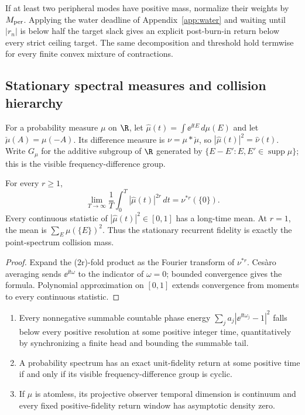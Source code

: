 If at least two peripheral modes have positive mass, normalize their weights
by $M_{\rm per}$.  Applying the water deadline of Appendix~\ref{app:water} and waiting
until $|r_n|$ is below half the target slack gives an explicit post-burn-in
return below every strict ceiling target.  The same decomposition and
threshold hold termwise for every finite convex mixture of contractions.

\subsection{Stationary spectral measures and collision hierarchy}

For a probability measure $\mu$ on $\R$, let
$\widehat\mu(t)=\int\ee^{\ii tE}\,d\mu(E)$ and let
$\check\mu(A)=\mu(-A)$.  Its difference measure is
$\nu=\mu*\check\mu$, so
$|\widehat\mu(t)|^2=\widehat\nu(t)$.
Write $G_\mu$ for the additive subgroup of $\R$ generated by
$\{E-E':E,E'\in\operatorname{supp}\mu\}$; this is the visible
frequency-difference group.

\begin{theorem}
For every $r\ge1$,
\[
 \lim_{T\to\infty}\frac1T\int_0^T
   |\widehat\mu(t)|^{2r}\,dt
 =\nu^{*r}(\{0\}).
\]
Every continuous statistic of $|\widehat\mu(t)|^2\in[0,1]$ has a
long-time mean.  At $r=1$, the mean is
$\sum_E\mu(\{E\})^2$.  Thus the stationary recurrent fidelity is exactly
the point-spectrum collision mass.
\end{theorem}

\begin{proof}
Expand the (2r)-fold product as the Fourier transform of $\nu^{*r}$.
Ces\`aro averaging sends $\ee^{\ii t\omega}$ to the indicator of
$\omega=0$; bounded convergence gives the formula.  Polynomial
approximation on $[0,1]$ extends convergence from moments to every
continuous statistic.
\end{proof}

\begin{theorem}
\leavevmode
\begin{enumerate}[leftmargin=1.6em]
\item Every nonnegative summable countable phase energy
  $\sum_j a_j|\ee^{\ii t\omega_j}-1|^2$ falls below every positive
  resolution at some positive integer time, quantitatively by synchronizing
  a finite head and bounding the summable tail.
\item A probability spectrum has an exact unit-fidelity return at some
  positive time if and only if its visible frequency-difference group is
  cyclic.
\item If $\mu$ is atomless, its projective observer temporal dimension is
  continuum and every fixed positive-fidelity return window has asymptotic
  density zero.
\end{enumerate}
\end{theorem}

